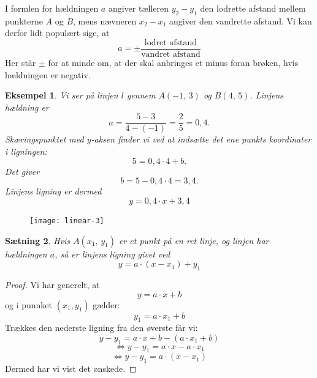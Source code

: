 \documentclass[12pt,oneside,a4paper]{article}
\newtheorem{thm}{Sætning}[section]
\newtheorem{eks}[thm]{Eksempel}
\begin{document}
I formlen for hældningen $a$ angiver tælleren $y_2-y_1$ den lodrette afstand
mellem punkterne $A$ og $B$, mens nævneren $x_2-x_1$ angiver den vandrette
afstand. Vi kan derfor lidt populært sige, at
$$
a = \pm \frac{\mbox{lodret afstand}}{\mbox{vandret afstand}}
$$
Her står $\pm$ for at minde om, at der skal anbringes et minus foran brøken,
hvis hældningen er negativ.
\begin{eks}
    Vi ser på linjen $l$ gennem $A(-1,\,3)$ og $B(4,\,5)$.
    Linjens hældning er
    $$
    a = \frac{5-3}{4-(-1)} = \frac{2}{5} = 0,4.
    $$
    Skæringspunktet med $y$-aksen finder vi ved at indsætte det ene punkts
    koordinater i ligningen:
    $$
    5 = 0,4\cdot 4 + b.
    $$
    Det giver
    $$
    b = 5 - 0,4\cdot 4 = 3,4.
    $$
    Linjens ligning er dermed
    $$
    y = 0,4 \cdot x + 3,4 
    $$
\end{eks}
\begin{figure}[ht]
    \centering
    \texttt{[image: linear-3]}
    \label{linear-3}
\end{figure}



\begin{thm}
    Hvis $A(x_1,\,y_1)$ er et punkt på en ret linje, og linjen har hældningen
    $a$, så er linjens ligning givet ved
    $$
    y = a\cdot (x-x_1) + y_1 
    $$
\end{thm}
\begin{proof}
    Vi har generelt, at 
    $$
    y = a\cdot x + b
    $$
    og i punnket $(x_1, y_1)$ gælder:
    $$
    y_1 = a\cdot x_1 + b
    $$
    Trækkes den nederste ligning fra den øverste får vi:
    $$
    y-y_1 = a \cdot x + b - (a \cdot x_1 + b)
    $$
    $$
    \Leftrightarrow y-y_1 = a \cdot x - a \cdot x_1
    $$
    $$
    \Leftrightarrow y-y_1 = a \cdot (x - x_1)
    $$
    Dermed har vi vist det ønskede.
\end{proof}
\end{document}
